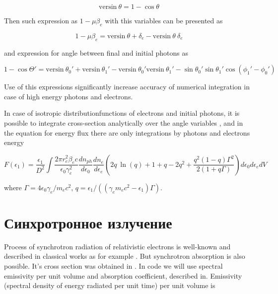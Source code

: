 \begin{equation}
	\text{versin}~\theta = 1 - \cos \theta
\end{equation}

Then such expression as $1 - \mu \beta_e$ with this variables can be presented as

\begin{equation}
	1 - \mu \beta_e =\text{versin}~\theta + \delta_e - \text{versin}~\theta~\delta_e
\end{equation}

and expression for angle between final and initial photons as

\begin{equation}
	1 - \cos \Theta' = \text{versin}~\theta_0' + \text{versin}~\theta_1' - \text{versin}~ \theta_0' \text{versin}~\theta_1' - \sin \theta_0'\sin \theta_1' \cos(\phi_1'-\phi_0')
\end{equation}

Use of this expressions significantly increase accuracy of numerical integration in case of high energy photons and electrons.

In case of isotropic distributionfunctions of electrons and initial photons, it is possible to integrate cross-section analytically over the angle variables \cite{JonesCompton, BykovUvarov2000}, and in the equation for energy flux there are only integrations by photons and electrons energy

\begin{equation}
	F(\epsilon_1)=\frac{\epsilon_1}{D^2}\int \frac{2 \pi r_e^2 \beta_e c}{\epsilon_0 \gamma_e^2} \frac{dn_{ph}}{d\epsilon_0}\frac{dn_e}{d\epsilon_e}(2 q~ \ln(q)+1+q-2q^2+\frac{q^2(1-q)\Gamma^2}{2(1+q\Gamma)})d\epsilon_0 d\epsilon_e dV
\end{equation}

where $\Gamma=4\epsilon_0\gamma_e/m_e c^2$, $q=\epsilon_1/((\gamma_e m_e c^2-\epsilon_1)\Gamma)$.

\section{Синхротронное излучение}\label{synchrotronFormulaSection}

Process of synchrotron radiation of relativistic electrons is well-known and described in classical works as for example \cite{Ginzburg1975}. But synchrotron absorption is also possible. It's cross section was obtained in \cite{Ghisellini1991}. In code we will use spectral emissivity per unit volume and absorption coefficient, described in\cite{Ghisellini}.
Emissivity (spectral density of energy radiated per unit time) per unit volume is

